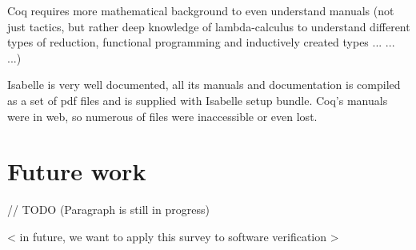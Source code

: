 \documentclass[article]{aaltoseries}
\begin{document}
Coq requires more mathematical background to even understand manuals (not just tactics, but rather deep knowledge of lambda-calculus to understand different types of reduction, functional programming and inductively created types ... ... ...)

Isabelle is very well documented, all its manuals and documentation is compiled as a set of pdf files and is supplied with Isabelle setup bundle. Coq's manuals were in web, so numerous of files were inaccessible or even lost.


\section{Future work}
\label{sec:future_work}

// TODO (Paragraph is still in progress)

< in future, we want to apply this survey to software verification >





\end{document}
